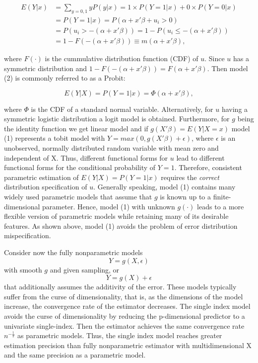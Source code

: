\documentclass[a4paper]{article}
\begin{document}
\[ 
\begin{split}
E(Y|x) & = \sum_{y=0,1} yP(y|x) = 1 \times P(Y=1|x) + 0 \times P(Y=0|x) \\
 & = P(Y=1|x) = P(\alpha + x'\beta + u_i > 0) \\
 & = P(u_i > -(\alpha + x'\beta)) = 1 - P(u_i \leq -(\alpha + x'\beta)) \\
 & = 1 - F(-(\alpha + x'\beta)) \equiv m(\alpha + x'\beta),
\end{split}
\]


where $F(\cdot)$ is the cummulative distribution function (CDF) of $u$. Since $u$ has a symmetric distribution and $1 - F(-(\alpha + x'\beta)) = F(\alpha + x'\beta)$. Then model (2) is commonly referred to as a Probit:

\[
E(Y|X) = P(Y=1|x) = \Phi(\alpha + x'\beta),
\]

where $\Phi$ is the CDF of a standard normal variable. Alternatively, for $u$ having a symmetric logistic distribution a logit model is obtained. Furthermore, for $g$ being the identity function we get linear model and if $g(X'\beta) = E(Y|X=x)$ model (1) represents a tobit model with $Y = max (0, g(X'\beta) + \epsilon)$, where $\epsilon$ is an unobserved, normally distributed random variable with mean zero and independent of X. 
Thus, different functional forms for $u$ lead to different functional forms for the conditional probability of $Y = 1$. Therefore, consistent parametric estimation of $E(Y|X) = P(Y=1|x)$ requires the \textit{correct} distribution specification of $u$. Generally speaking, model (1) contains many widely used parametric models that assume that $g$ is known up to a finite-dimensional parameter. 
Hence, model (1) with unknown $g(\cdot)$ leads to a more flexible version of parametric models while retaining many of its desirable features. As shown above, model (1) avoids the problem of error distribution mispecification. 

Consider now the fully nonparametric models
\[Y = g(X, \epsilon)\]
with smooth $g$ and given sampling,  or  
\[Y = g(X) + \epsilon\]
that additionally assumes the additivity of the error. These models typically suffer from the curse of dimensionality, that is, as the dimensions of the model increase, the convergence rate of the estimator decreases.
The single index model avoids the curse of dimensionality by reducing the p-dimensional predictor to a univariate single-index. Then the estimator achieves the same convergence rate $n^{-\frac{1}{2}}$ as parametric models. Thus, the single index model reaches greater estimation precision than fully nonparametric estimator with multidimensional X and the same precision as a parametric model.
\end{document}
